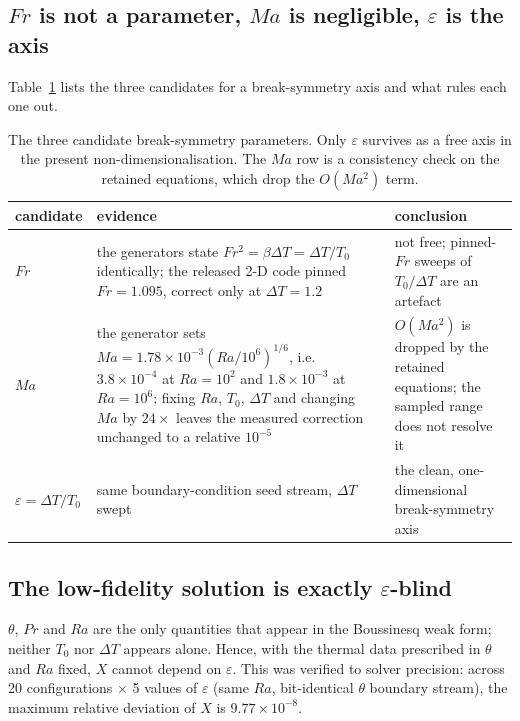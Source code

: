 \documentclass[preprint,11pt,a4paper,times,doubleblind]{elsarticle}
\begin{document}
\subsection{$Fr$ is not a parameter, $Ma$ is negligible, $\varepsilon$ is the axis}
\label{sec:axis}

Table~\ref{tab:axis} lists the three candidates for a break-symmetry axis and what rules each one
out.

\begin{table}[htbp]
\centering
\footnotesize
\caption{The three candidate break-symmetry parameters. Only $\varepsilon$ survives as a free axis
in the present non-dimensionalisation. The $Ma$ row is a consistency check on the retained
equations, which drop the $O(Ma^2)$ term.}
\label{tab:axis}
\setlength{\tabcolsep}{3pt}
\begin{tabular}{@{}p{2.0cm}p{6.4cm}p{3.6cm}@{}}
\toprule
candidate & evidence & conclusion\\
\midrule
$Fr$ & the generators state $Fr^2=\beta\Delta T=\Delta T/T_0$ identically; the released 2-D code
pinned $Fr=1.095$, correct only at $\Delta T=1.2$ & not free; pinned-$Fr$ sweeps of $T_0/\Delta T$
are an artefact\\
$Ma$ & the generator sets $Ma=1.78\times10^{-3}(Ra/10^6)^{1/6}$, i.e.\
$3.8\times10^{-4}$ at $Ra=10^2$ and $1.8\times10^{-3}$ at $Ra=10^6$; fixing $Ra$, $T_0$,
$\Delta T$ and changing $Ma$ by $24\times$ leaves the measured correction unchanged to a relative
$10^{-5}$ & $O(Ma^2)$ is dropped by the retained equations; the sampled range does not resolve it\\
$\varepsilon=\Delta T/T_0$ & same boundary-condition seed stream, $\Delta T$ swept & the clean,
one-dimensional break-symmetry axis\\
\bottomrule
\end{tabular}
\end{table}


\subsection{The low-fidelity solution is exactly $\varepsilon$-blind}
\label{sec:blind}

$\theta$, $Pr$ and $Ra$ are the only quantities that appear in the Boussinesq weak form; neither
$T_0$ nor $\Delta T$ appears alone. Hence, with the thermal data prescribed in $\theta$ and $Ra$
fixed, $X$ cannot depend on $\varepsilon$. This was verified to solver precision: across
20 configurations $\times$ 5 values of $\varepsilon$ (same $Ra$, bit-identical $\theta$ boundary
stream), the maximum relative deviation of $X$ is $9.77\times10^{-8}$.
\end{document}
